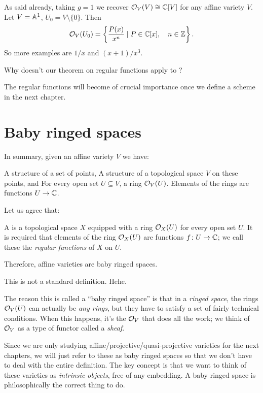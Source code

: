 \begin{example}
	\listhack
	\begin{enumerate}[(a)]
		\ii As said already,
		taking $g=1$ we recover $\mathcal O_V(V) \cong \mathbb C[V]$
		for any affine variety $V$.
		\ii Let $V = \mathbb A^1$, $U_0 = V \setminus \{0\}$. Then
		\[ \mathcal O_V(U_0)
			= \left\{ \frac{P(x)}{x^n} \mid P \in \mathbb C[x],
			\quad n \in \mathbb Z \right\}. \]
		So more examples are $1/x$ and $(x+1)/x^3$.
	\end{enumerate}
\end{example}

\begin{ques}
	Why doesn't our theorem on regular functions apply to ?
\end{ques}

The regular functions will become of crucial importance
once we define a scheme in the next chapter.

\section{Baby ringed spaces}
In summary, given an affine variety $V$ we have:
\begin{itemize}
	\ii A structure of a set of points,
	\ii A structure of a topological space $V$ on these points, and
	\ii For every open set $U \subseteq V$, a ring $\mathcal O_V(U)$.
	Elements of the rings are functions $U \to \mathbb C$.
\end{itemize}
Let us agree that:
\begin{definition}
	A  is a topological space $X$
	equipped with a ring $\mathcal O_X(U)$ for every open set $U$.
	It is required that elements of the ring $\mathcal O_X(U)$
	are functions $f \colon U \to \mathbb C$;
	we call these the \emph{regular functions} of $X$ on $U$.
\end{definition}
Therefore, affine varieties are baby ringed spaces.
\begin{remark}
	This is not a standard definition. Hehe.
\end{remark}

The reason this is called a ``baby ringed space''
is that in a \emph{ringed space},
the rings $\mathcal O_V(U)$ can actually be \emph{any rings},
but they have to satisfy a set of fairly technical conditions.
When this happens, it's the $\mathcal O_V$ that does all the work;
we think of $\mathcal O_V$ as a type of functor called a \emph{sheaf}.

Since we are only studying affine/projective/quasi-projective varieties
for the next chapters, we will just refer to these as baby ringed spaces
so that we don't have to deal with the entire definition.
The key concept is that we want to think of these varieties
as \emph{intrinsic objects}, free of any embedding.
A baby ringed space is philosophically the correct thing to do.

